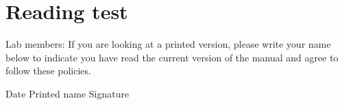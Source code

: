\documentclass[letterpaper,12pt,oneside]{memoir}
\begin{document}
\chapter*{Reading test}
\noindent Lab members: If you are looking at a printed version, please write your name below to indicate you have read the current version of the manual and agree to follow these policies.

\vspace{,5in}

\noindent Date \hspace{.5in} Printed name \hspace{1.5in} Signature\\
\end{document}
